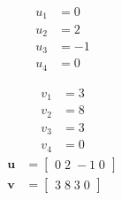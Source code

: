 \[\begin{aligned}
u_{1} &= 0 \\
u_{2} &= 2 \\
u_{3} &= -1 \\
u_{4} &= 0 
\end{aligned}\]

\[\begin{aligned}
v_{1} &= 3 \\
v_{2} &= 8 \\
v_{3} &= 3 \\
v_{4} &= 0 
\end{aligned}\]
\[\begin{aligned}
\mathbf{u} &= \begin{bmatrix}0\;2\;-1\;0\end{bmatrix} \\
\mathbf{v} &= \begin{bmatrix}3\;8\;3\;0\end{bmatrix}
\end{aligned}\]

